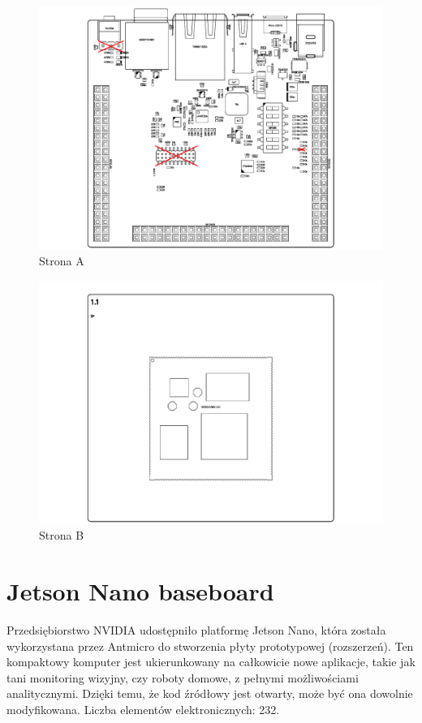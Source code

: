 \begin{figure}[H]
	\centering
	\includegraphics[width=0.8\linewidth,clip, trim=3cm 0.2cm 3cm 0.1cm]{./chapters/chapter5/chilli_A.pdf}
	\caption{Strona A}\label{chilli:StronaA}
\end{figure}


\begin{figure}[H]
	\centering
	\includegraphics[width=0.8\linewidth,clip, trim=3cm 0.1cm 3cm 0.1cm]{./chapters/chapter5/chilli_B.pdf}
	\caption{Strona B}\label{chilli:StronaB}
\end{figure}


\section{Jetson Nano baseboard}
Przedsiębiorstwo NVIDIA udostępniło platformę Jetson Nano, która została wykorzystana przez Antmicro do stworzenia płyty prototypowej (rozszerzeń).
Ten kompaktowy komputer jest ukierunkowany na całkowicie nowe aplikacje, takie jak tani monitoring wizyjny, czy roboty domowe, z pełnymi możliwościami analitycznymi.
Dzięki temu, że kod źródłowy jest otwarty, może być ona dowolnie modyfikowana.
Liczba elementów elektronicznych: 232.

